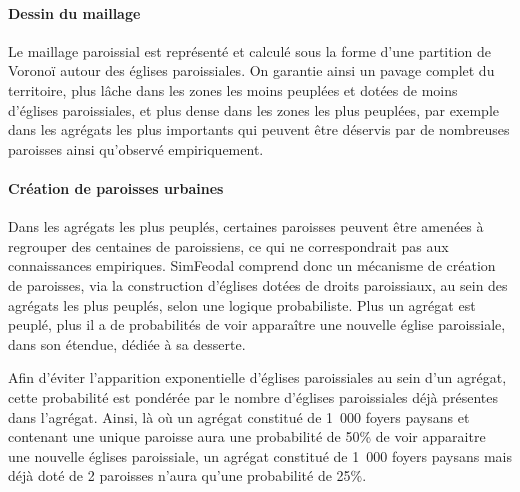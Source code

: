 \paragraph{Dessin du maillage} Le maillage paroissial est représenté et calculé sous la forme d'une partition de Voronoï autour des églises paroissiales.
On garantie ainsi un pavage complet du territoire, plus lâche dans les zones les moins peuplées et dotées de moins d'églises paroissiales, et plus dense dans les zones les plus peuplées, par exemple dans les agrégats les plus importants qui peuvent être déservis par de nombreuses paroisses ainsi qu'observé empiriquement.

\paragraph{Création de paroisses \og urbaines\fg{}} Dans les agrégats les plus peuplés, certaines paroisses peuvent être amenées à regrouper des centaines de paroissiens, ce qui ne correspondrait pas aux connaissances empiriques.
SimFeodal comprend donc un mécanisme de création de paroisses, via la construction d'églises dotées de droits paroissiaux, au sein des agrégats les plus peuplés, selon une logique probabiliste. 
Plus un agrégat est peuplé, plus il a de probabilités de voir apparaître une nouvelle église paroissiale, dans son étendue, dédiée à sa desserte.

Afin d'éviter l'apparition exponentielle d'églises paroissiales au sein d'un agrégat, cette probabilité est pondérée par le nombre d'églises paroissiales déjà présentes dans l'agrégat.
Ainsi, là où un agrégat constitué de 1~000 foyers paysans et contenant une unique paroisse aura une probabilité de 50\% de voir apparaitre une nouvelle églises paroissiale, un agrégat constitué de 1~000 foyers paysans mais déjà doté de 2 paroisses n'aura qu'une probabilité de 25\%.

